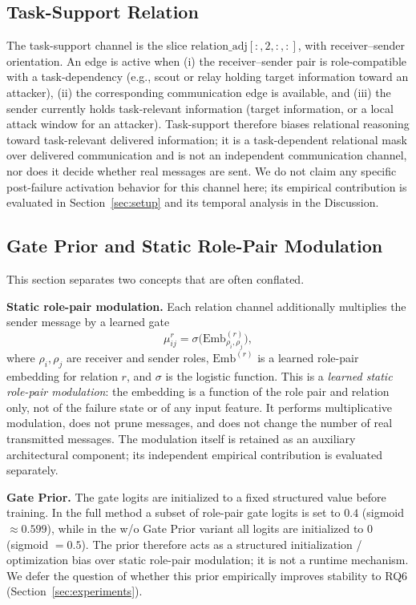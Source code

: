 \subsection{Task-Support Relation}
\label{sec:task_support}

The task-support channel is the slice $\mathrm{relation\_adj}[:,2,:,:]$, with receiver--sender orientation. An edge is active when (i) the receiver--sender pair is role-compatible with a task-dependency (e.g., scout or relay holding target information toward an attacker), (ii) the corresponding communication edge is available, and (iii) the sender currently holds task-relevant information (target information, or a local attack window for an attacker). Task-support therefore biases relational reasoning toward task-relevant delivered information; it is a task-dependent relational mask over delivered communication and is not an independent communication channel, nor does it decide whether real messages are sent. We do not claim any specific post-failure activation behavior for this channel here; its empirical contribution is evaluated in Section~\ref{sec:setup} and its temporal analysis in the Discussion.

\subsection{Gate Prior and Static Role-Pair Modulation}
\label{sec:gate_prior}

This section separates two concepts that are often conflated.

\textbf{Static role-pair modulation.} Each relation channel additionally multiplies the sender message by a learned gate
\begin{equation}
    \mu^{r}_{ij} = \sigma\big( \mathrm{Emb}^{(r)}_{\rho_i,\rho_j} \big),
\label{eq:rpg}
\end{equation}
where $\rho_i, \rho_j$ are receiver and sender roles, $\mathrm{Emb}^{(r)}$ is a learned role-pair embedding for relation $r$, and $\sigma$ is the logistic function. This is a \emph{learned static role-pair modulation}: the embedding is a function of the role pair and relation only, not of the failure state or of any input feature. It performs multiplicative modulation, does not prune messages, and does not change the number of real transmitted messages. The modulation itself is retained as an auxiliary architectural component; its independent empirical contribution is evaluated separately.

\textbf{Gate Prior.} The gate logits are initialized to a fixed structured value before training. In the full method a subset of role-pair gate logits is set to $0.4$ (sigmoid $\approx 0.599$), while in the w/o Gate Prior variant all logits are initialized to $0$ (sigmoid $= 0.5$). The prior therefore acts as a structured initialization / optimization bias over static role-pair modulation; it is not a runtime mechanism. We defer the question of whether this prior empirically improves stability to RQ6 (Section~\ref{sec:experiments}).

